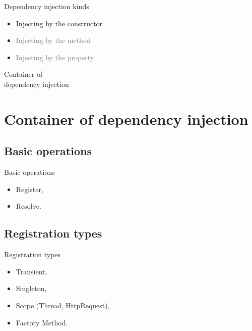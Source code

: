 \documentclass{beamer}
\begin{document}
\begin{frame}{Dependency injection kinds}
     \begin{Large}
	\begin{itemize}
		\item Injecting by the constructor
		\item \textcolor{gray}{Injecting by the method}
		\item \textcolor{gray}{Injecting by the property}
	\end{itemize}
     \end{Large}
\end{frame}

\begin{frame}{}
	\begin{center}
		\Huge{Container of\\ dependency injection}
	\end{center}
\end{frame}

\section{Container of dependency injection}

\subsection*{Basic operations}

\begin{frame}{Basic operations}
     \begin{Large}
	\begin{itemize}
		\item Register,
		\item Resolve.
	\end{itemize}
     \end{Large}
\end{frame}

\subsection*{Registration types}

\begin{frame}{Registration types}
     \begin{Large}
	\begin{itemize}
		\item Transient,
		\item Singleton,
		\item Scope (Thread, HttpRequest),
		\item Factory Method.
	\end{itemize}
     \end{Large}
\end{frame}
\end{document}
